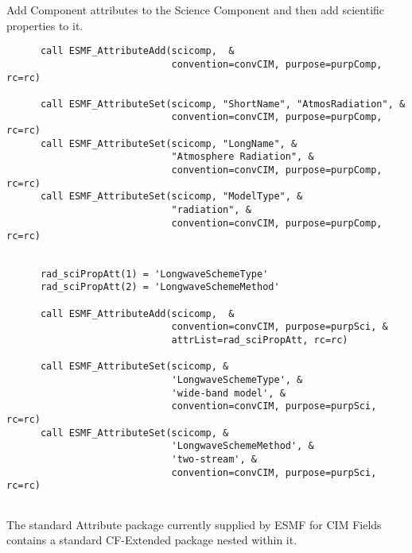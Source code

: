 
  \begin{sloppypar}
       Add Component attributes to the Science Component and then add
       scientific properties to it.
  \end{sloppypar} 

 \begin{verbatim}
      call ESMF_AttributeAdd(scicomp,  &
                             convention=convCIM, purpose=purpComp, rc=rc)

      call ESMF_AttributeSet(scicomp, "ShortName", "AtmosRadiation", &
                             convention=convCIM, purpose=purpComp, rc=rc)
      call ESMF_AttributeSet(scicomp, "LongName", &
                             "Atmosphere Radiation", &
                             convention=convCIM, purpose=purpComp, rc=rc)
      call ESMF_AttributeSet(scicomp, "ModelType", &
                             "radiation", &
                             convention=convCIM, purpose=purpComp, rc=rc)
 
\end{verbatim}
 

 \begin{verbatim}
      rad_sciPropAtt(1) = 'LongwaveSchemeType'
      rad_sciPropAtt(2) = 'LongwaveSchemeMethod'

      call ESMF_AttributeAdd(scicomp,  &
                             convention=convCIM, purpose=purpSci, &
                             attrList=rad_sciPropAtt, rc=rc)

      call ESMF_AttributeSet(scicomp, &
                             'LongwaveSchemeType', &
                             'wide-band model', &
                             convention=convCIM, purpose=purpSci, rc=rc)
      call ESMF_AttributeSet(scicomp, &
                             'LongwaveSchemeMethod', &
                             'two-stream', &
                             convention=convCIM, purpose=purpSci, rc=rc)
 
\end{verbatim}
 

  \begin{sloppypar}
       The standard Attribute package currently supplied by ESMF for
       CIM Fields contains a standard CF-Extended package nested within it.
  \end{sloppypar} 

